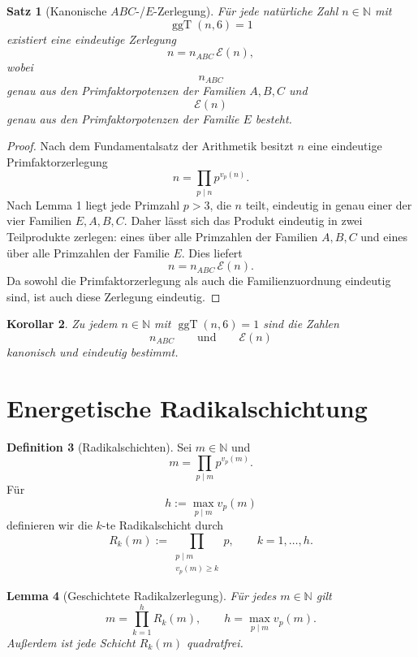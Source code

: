 \documentclass[11pt,a4paper]{article}
\newtheorem{satz}{Satz}
\newtheorem{lemma}[satz]{Lemma}
\newtheorem{korollar}[satz]{Korollar}
\theoremstyle{definition}
\newtheorem{definition}[satz]{Definition}
\theoremstyle{remark}
\newcommand{\N}{\mathbb{N}}
\newcommand{\ggT}{\operatorname{ggT}}
\newcommand{\vp}{v_p}
\begin{document}
	\begin{satz}[Kanonische \(ABC\)-/\(E\)-Zerlegung]
		Für jede natürliche Zahl \(n\in\N\) mit
		\[
		\ggT(n,6)=1
		\]
		existiert eine eindeutige Zerlegung
		\[
		n=n_{ABC}\,\mathcal E(n),
		\]
		wobei
		\[
		n_{ABC}
		\]
		genau aus den Primfaktorpotenzen der Familien \(A,B,C\) und
		\[
		\mathcal E(n)
		\]
		genau aus den Primfaktorpotenzen der Familie \(E\) besteht.
	\end{satz}
	
	\begin{proof}
		Nach dem Fundamentalsatz der Arithmetik besitzt \(n\) eine eindeutige Primfaktorzerlegung
		\[
		n=\prod_{p\mid n} p^{\vp(n)}.
		\]
		Nach Lemma 1 liegt jede Primzahl \(p>3\), die \(n\) teilt, eindeutig in genau einer der vier Familien
		\(E,A,B,C\). Daher lässt sich das Produkt eindeutig in zwei Teilprodukte zerlegen:
		eines über alle Primzahlen der Familien \(A,B,C\) und eines über alle Primzahlen der Familie \(E\).
		Dies liefert
		\[
		n=n_{ABC}\,\mathcal E(n).
		\]
		Da sowohl die Primfaktorzerlegung als auch die Familienzuordnung eindeutig sind, ist auch diese
		Zerlegung eindeutig.
	\end{proof}
	
	\begin{korollar}
		Zu jedem \(n\in\N\) mit \(\ggT(n,6)=1\) sind die Zahlen
		\[
		n_{ABC}\qquad\text{und}\qquad \mathcal E(n)
		\]
		kanonisch und eindeutig bestimmt.
	\end{korollar}
	
	\section{Energetische Radikalschichtung}
	
	\begin{definition}[Radikalschichten]
		Sei \(m\in\N\) und
		\[
		m=\prod_{p\mid m} p^{\vp(m)}.
		\]
		Für
		\[
		h:=\max_{p\mid m}\vp(m)
		\]
		definieren wir die \(k\)-te Radikalschicht durch
		\[
		R_k(m):=
		\prod_{\substack{p\mid m\\ \vp(m)\ge k}} p,
		\qquad k=1,\dots,h.
		\]
	\end{definition}
	
	\begin{lemma}[Geschichtete Radikalzerlegung]
		Für jedes \(m\in\N\) gilt
		\[
		m=\prod_{k=1}^{h} R_k(m),
		\qquad
		h=\max_{p\mid m}\vp(m).
		\]
		Außerdem ist jede Schicht \(R_k(m)\) quadratfrei.
	\end{lemma}
	
\end{document}
